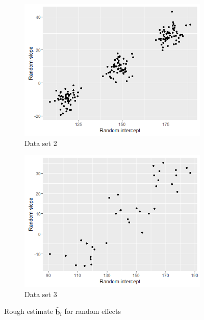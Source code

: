 \begin{figure}[!htb]
\centering
\begin{subfigure}[b]{0.4\textwidth}
		\includegraphics[width=\textwidth]{mainmatter/chapter_5_simulation_study/ds_3wellsep_randplot.png}
        \caption{\label{fig : ds_3wellsep_randplot}Data set 2}
	\end{subfigure}
	\begin{subfigure}[b]{0.4\textwidth}
		\includegraphics[width=\textwidth]{mainmatter/chapter_5_simulation_study/ds_3wellsep3ppg_randplot.png}
       \caption{\label{fig : ds_3wellsep3ppg_randplot}Data set 3}
	\end{subfigure}    
    
\caption{\label{fig : ds_3comp_3ppgwelsep}Rough estimate $\tilde{\boldsymbol{b}_i}$ for random effects}
\end{figure}

